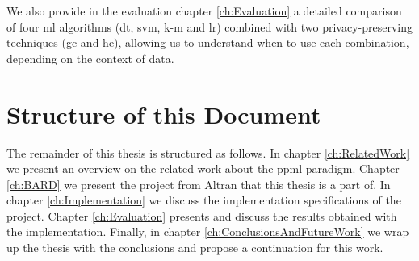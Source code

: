 We also provide in the evaluation chapter \ref{ch:Evaluation} a detailed comparison of four \ac{ml} algorithms (\ac{dt}, \ac{svm}, \ac{k-m} and \ac{lr}) combined with two privacy-preserving techniques (\ac{gc} and \ac{he}), allowing us to understand when to use each combination, depending on the context of data. 








\section{Structure of this Document}
\label{sec:Intro_StructureOfThisDocument}
The remainder of this thesis is structured as follows.
In chapter \ref{ch:RelatedWork} we present an overview on the related work about the \ac{ppml} paradigm.
Chapter \ref{ch:BARD} we present the project from Altran that this thesis is a part of.
In chapter \ref{ch:Implementation} we discuss the implementation specifications of the project.
Chapter \ref{ch:Evaluation} presents and discuss the results obtained with the implementation.
Finally, in chapter \ref{ch:ConclusionsAndFutureWork} we wrap up the thesis with the conclusions and propose a continuation for this work.

